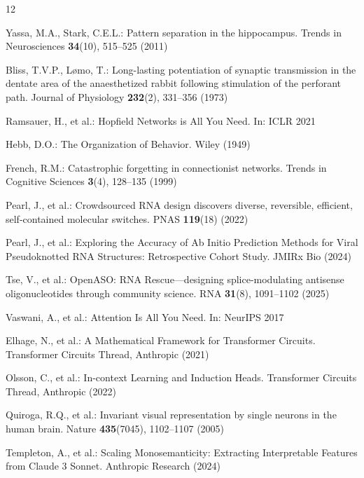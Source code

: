 \documentclass[runningheads]{llncs}
\begin{document}
\begin{thebibliography}{12}

Yassa, M.A., Stark, C.E.L.: Pattern separation in the hippocampus. Trends in Neurosciences \textbf{34}(10), 515--525 (2011)

Bliss, T.V.P., L{\o}mo, T.: Long-lasting potentiation of synaptic transmission in the dentate area of the anaesthetized rabbit following stimulation of the perforant path. Journal of Physiology \textbf{232}(2), 331--356 (1973)

Ramsauer, H., et al.: Hopfield Networks is All You Need. In: ICLR 2021

Hebb, D.O.: The Organization of Behavior. Wiley (1949)

French, R.M.: Catastrophic forgetting in connectionist networks. Trends in Cognitive Sciences \textbf{3}(4), 128--135 (1999)

Pearl, J., et al.: Crowdsourced RNA design discovers diverse, reversible, efficient, self-contained molecular switches. PNAS \textbf{119}(18) (2022)

Pearl, J., et al.: Exploring the Accuracy of Ab Initio Prediction Methods for Viral Pseudoknotted RNA Structures: Retrospective Cohort Study. JMIRx Bio (2024)

Tse, V., et al.: OpenASO: RNA Rescue---designing splice-modulating antisense oligonucleotides through community science. RNA \textbf{31}(8), 1091--1102 (2025)

Vaswani, A., et al.: Attention Is All You Need. In: NeurIPS 2017

Elhage, N., et al.: A Mathematical Framework for Transformer Circuits. Transformer Circuits Thread, Anthropic (2021)

Olsson, C., et al.: In-context Learning and Induction Heads. Transformer Circuits Thread, Anthropic (2022)

Quiroga, R.Q., et al.: Invariant visual representation by single neurons in the human brain. Nature \textbf{435}(7045), 1102--1107 (2005)

Templeton, A., et al.: Scaling Monosemanticity: Extracting Interpretable Features from Claude 3 Sonnet. Anthropic Research (2024)

\end{thebibliography}
\end{document}
